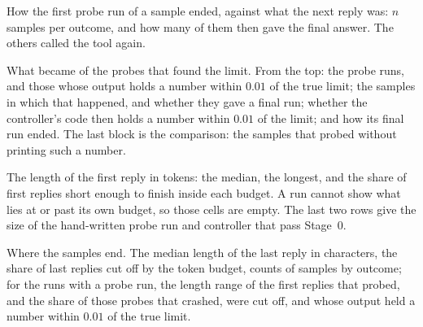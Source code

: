 \documentclass[11pt,a4paper]{article}
\begin{document}
\begin{table}[h]
\centering\small
\resizebox{\linewidth}{!}{}
\caption{How the first probe run of a sample ended, against what the next
reply was: $n$ samples per outcome, and how many of them then gave the final
answer. The others called the tool again.}
\label{tab:after-first-probe}
\end{table}

\begin{table}[h]
\centering\small
\resizebox{\linewidth}{!}{}
\caption{What became of the probes that found the limit. From the top: the
probe runs, and those whose output holds a number within $0.01$ of the true
limit; the samples in which that happened, and whether they gave a final
run; whether the controller's code then holds a number within $0.01$ of the
limit; and how its final run ended. The last block is the comparison: the
samples that probed without printing such a number.}
\label{tab:probe-fate}
\end{table}

\begin{table}[h]
\centering\small
\resizebox{\linewidth}{!}{}
\caption{The length of the first reply in tokens: the median, the longest,
and the share of first replies short enough to finish inside each budget. A
run cannot show what lies at or past its own budget, so those cells are
empty. The last two rows give the size of the hand-written probe run and
controller that pass Stage~0.}
\label{tab:reply-tokens}
\end{table}

\begin{table}[h]
\centering\small
\resizebox{\linewidth}{!}{}
\caption{Where the samples end. The median length of the last reply in
characters, the share of last replies cut off by the token budget, counts of
samples by outcome; for the runs with a probe run, the length range of the
first replies that probed, and the share of those probes that crashed, were
cut off, and whose output held a number within $0.01$ of the true limit.}
\label{tab:diagnostics}
\end{table}
\end{document}
